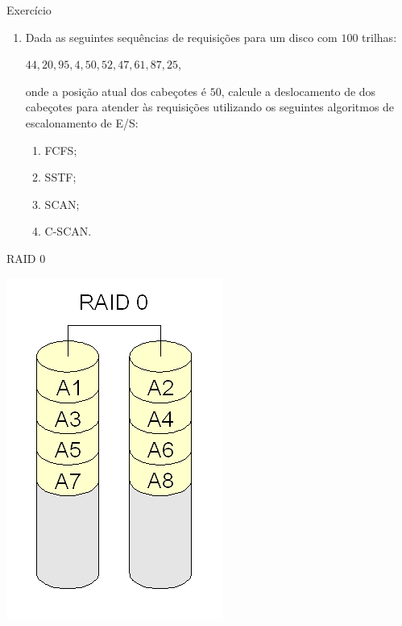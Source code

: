 
\begin{frame}{Exercício}

  \begin{enumerate}
  \item Dada as seguintes sequências de requisições para um 
    disco com $100$ trilhas:
    \begin{center}
      $44, 20, 95, 4, 50, 52, 47, 61, 87, 25$,
    \end{center}
    onde a posição atual dos cabeçotes é $50$, calcule a deslocamento
    de dos cabeçotes para atender às requisições utilizando os
    seguintes algoritmos de escalonamento de E/S:
    \begin{enumerate}
    \item FCFS;
    \item SSTF;
    \item SCAN;
    \item C-SCAN.
    \end{enumerate}
  \end{enumerate}
  
\end{frame}




\begin{frame}{RAID 0}
  
  \includegraphics[scale=.3]{raid0.png}

\end{frame}


